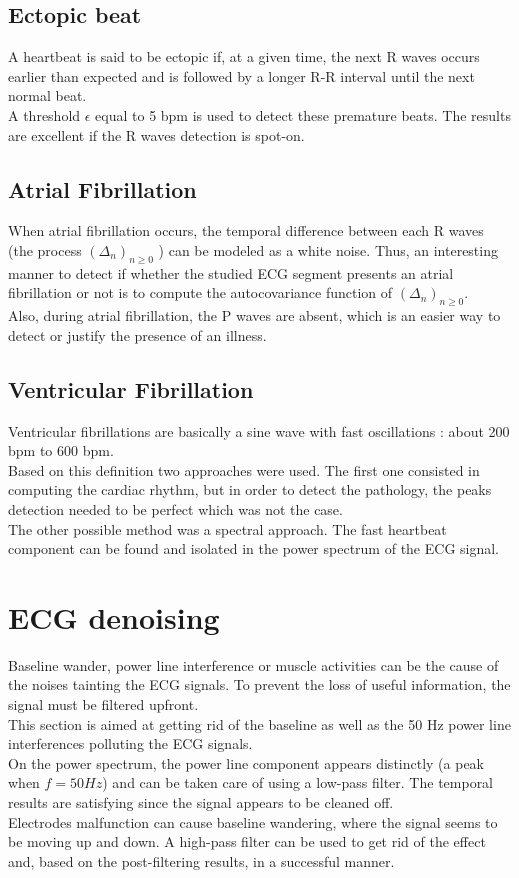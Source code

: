 \documentclass[11pt]{article}
\begin{document}
	\subsection{Ectopic beat}
		A heartbeat is said to be ectopic if, at a given time, the next R waves occurs earlier than expected and is followed by a longer R-R interval until the next normal beat.\\
		A threshold $\epsilon$ equal to 5 bpm is used to detect these premature beats. The results are excellent if the R waves detection is spot-on.
	\subsection{Atrial Fibrillation}
		When atrial fibrillation occurs, the temporal difference between each R waves (the process $(\Delta_n)_{n \ge 0}$ ) can be modeled as a white noise. Thus, an interesting manner to detect if whether the studied ECG segment presents an atrial fibrillation or not is to compute the autocovariance function of $(\Delta_n)_{n \ge 0}$.\\
		Also, during atrial fibrillation, the P waves are absent, which is an easier way to detect or justify the presence of an illness.
	\subsection{Ventricular Fibrillation}
		Ventricular fibrillations are basically a sine wave with fast oscillations : about 200 bpm to 600 bpm.\\
		Based on this definition two approaches were used. The first one consisted in computing the cardiac rhythm, but in order to detect the pathology, the peaks detection needed to be perfect which was not the case.\\
		The other possible method was a spectral approach. The fast heartbeat component can be found and isolated in the power spectrum of the ECG signal.

		
\section{ECG denoising}
	Baseline wander, power line interference or muscle activities can be the cause of the noises tainting the ECG signals. To prevent the loss of useful information, the signal must be filtered upfront. \\
	This section is aimed at getting rid of the baseline as well as the 50 Hz power line interferences polluting the ECG signals.\\
	On the power spectrum, the power line component appears distinctly (a peak when $f=50 Hz$) and can be taken care of using a low-pass filter. The temporal results are satisfying since the signal appears to be cleaned off.\\
	Electrodes malfunction can cause baseline wandering, where the signal seems to be moving up and down. A high-pass filter can be used to get rid of the effect and, based on the post-filtering results, in a successful manner.
\end{document}

